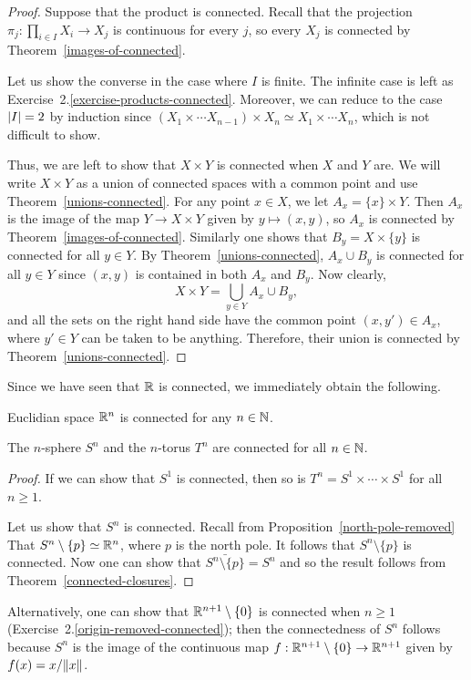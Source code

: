 \begin{proof}
  Suppose that the product is connected. Recall that the projection $\pi_j : \prod_{i \in I} X_i \to X_j$ is continuous for every $j$, so every $X_j$ is connected by Theorem~\ref{images-of-connected}.
  
  Let us show the converse in the case where $I$ is finite. The infinite case is left as Exercise~2.\ref{exercise-products-connected}. Moreover, we can reduce to the case $\lvert I \rvert = 2$ by induction since $(X_1 \times \cdots X_{n-1}) \times X_n \simeq X_1 \times \cdots X_n$, which is not difficult to show.
  
  Thus, we are left to show that $X \times Y$ is connected when $X$ and $Y$ are. We will write $X \times Y$ as a union of connected spaces with a common point and use Theorem~\ref{unions-connected}. For any point $x \in X$, we let $A_x = \{x \} \times Y$. Then $A_x$ is the image of the map $Y \to X \times Y$ given by $y \mapsto (x,y)$, so $A_x$ is connected by Theorem~\ref{images-of-connected}. Similarly one shows that $B_y = X \times \{y\}$ is connected for all $y \in Y$. By Theorem~\ref{unions-connected}, $A_x \cup B_y$ is connected for all $y \in Y$ since $(x,y)$ is contained in both $A_x$ and $B_y$. Now clearly,
  \[
    X \times Y = \bigcup_{y \in Y} A_x \cup B_y,
  \]
  and all the sets on the right hand side have the common point $(x,y') \in A_x$, where $y' \in Y$ can be taken to be anything. Therefore, their union is connected by Theorem~\ref{unions-connected}.
\end{proof}
Since we have seen that $\mathbb{R}$ is connected, we immediately obtain the following.
\begin{cor}
  Euclidian space $\mathbb{R}^n$ is connected for any $n \in \mathbb{N}$.
\end{cor}
\begin{prop}
  The $n$-sphere $S^n$ and the $n$-torus $T^n$ are connected for all $n \in \mathbb{N}$.
\end{prop}
\begin{proof}
  If we can show that $S^1$ is connected, then so is $T^n = S^1 \times \cdots \times S^1$ for all $n \geq 1$.
  
  Let us show that $S^n$ is connected. Recall from Proposition~\ref{north-pole-removed} That $S^n \setminus \{p\} \simeq \mathbb{R}^n$, where $p$ is the north pole. It follows that $S^n \setminus \{p\}$ is connected. Now one can show that $\bar{S^n \setminus \{p\}} = S^n$ and so the result follows from Theorem~\ref{connected-closures}.
\end{proof}
Alternatively, one can show that $\mathbb{R}^{n+1} \setminus \{0\}$ is connected when $n \geq 1$ (Exercise~2.\ref{origin-removed-connected}); then the connectedness of $S^n$ follows because $S^n$ is the image of the continuous map $f : \mathbb{R}^{n+1} \setminus \{0 \} \to \mathbb{R}^{n+1}$ given by $f(x) = x/\lVert x \rVert$.

